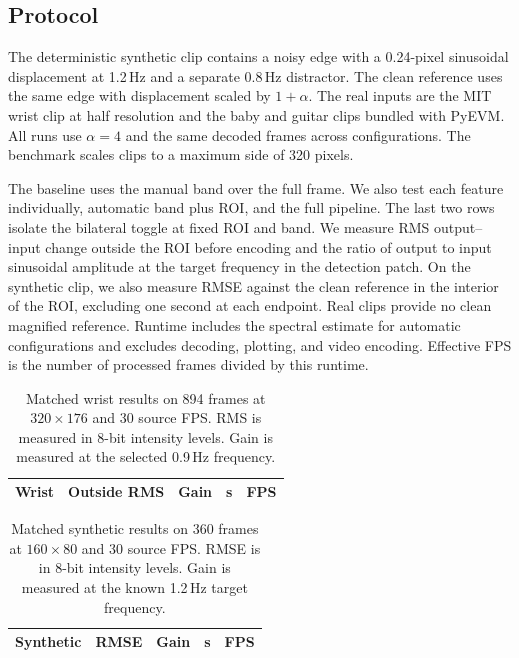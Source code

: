 \documentclass[10pt,twocolumn,letterpaper]{article}
\begin{document}
\subsection{Protocol}
The deterministic synthetic clip contains a noisy edge with a
0.24-pixel sinusoidal displacement at 1.2\,Hz and a separate 0.8\,Hz
distractor. The clean reference uses the same edge with displacement
scaled by $1+\alpha$. The real inputs are the MIT wrist clip at half
resolution and the baby and guitar clips bundled with PyEVM. All runs
use $\alpha=4$ and the same decoded frames across configurations.
The benchmark scales clips to a maximum side of 320 pixels.

The baseline uses the manual band over the full frame. We also test each
feature individually, automatic band plus ROI, and the full pipeline.
The last two rows isolate the bilateral toggle at fixed ROI and band.
We measure RMS output--input change outside the ROI before encoding
and the ratio of output to input sinusoidal amplitude at the target
frequency in the detection patch. On the synthetic clip, we also
measure RMSE against the clean reference in the interior of the ROI,
excluding one second at each endpoint. Real clips provide no clean
magnified reference. Runtime includes the spectral estimate for automatic
configurations and excludes decoding, plotting, and video encoding.
Effective FPS is the number of processed frames divided by this runtime.

\begin{table}[t]
\centering\small
\setlength{\tabcolsep}{3pt}
\begin{tabular}{@{}lrrrr@{}}
\toprule
Wrist & Outside RMS & Gain & s & FPS\\
\midrule

\bottomrule
\end{tabular}
\caption{Matched wrist results on 894 frames at $320 \times 176$ and
30 source FPS. RMS is measured in 8-bit intensity levels. Gain is measured
at the selected 0.9\,Hz frequency.}
\label{tab:wrist}
\end{table}

\begin{table}[t]
\centering\small
\setlength{\tabcolsep}{3pt}
\begin{tabular}{@{}lrrrr@{}}
\toprule
Synthetic & RMSE & Gain & s & FPS\\
\midrule

\bottomrule
\end{tabular}
\caption{Matched synthetic results on 360 frames at $160 \times 80$ and
30 source FPS. RMSE is in 8-bit intensity levels. Gain is measured at the
known 1.2\,Hz target frequency.}
\label{tab:synthetic}
\end{table}
\end{document}
